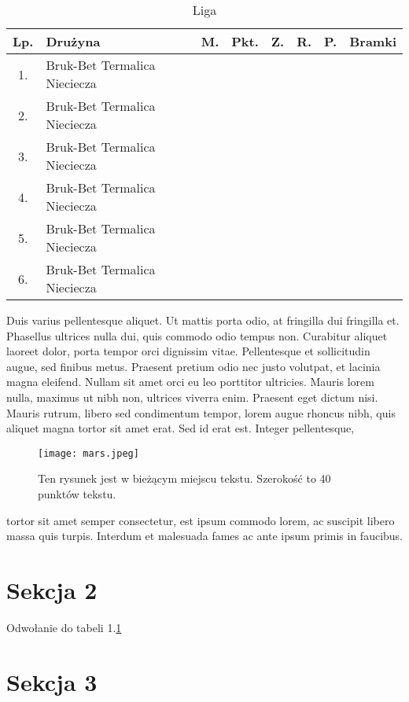 \documentclass[11pt,a4paper]{article}  %
\begin{document}
\begin{table}[h]
\centering
\label{tab:tabela}

\begin{tabular}{|c|l|c|c|c|c|c|c|}
\hline
Lp. & Drużyna & M. & Pkt. & Z. & R. & P. & Bramki \\ \hline
1.  & Bruk-Bet Termalica Nieciecza        &    &      &    &    &    &        \\ \hline
2.  & Bruk-Bet Termalica Nieciecza        &    &      &    &    &    &        \\ \hline
3.  & Bruk-Bet Termalica Nieciecza       &    &      &    &    &    &        \\ \hline
4.  & Bruk-Bet Termalica Nieciecza        &    &      &    &    &    &        \\ \hline
5.  & Bruk-Bet Termalica Nieciecza        &    &      &    &    &    &        \\ \hline
6.  & Bruk-Bet Termalica Nieciecza       &    &      &    &    &    &        \\ \hline

\end{tabular}
\caption{Liga}
\end{table}

Duis varius pellentesque aliquet. Ut mattis porta odio, at fringilla dui fringilla et. Phasellus ultrices nulla dui, quis commodo odio tempus non. Curabitur aliquet laoreet dolor, porta tempor orci dignissim vitae. Pellentesque et sollicitudin augue, sed finibus metus. Praesent pretium odio nec justo volutpat, et lacinia magna eleifend. Nullam sit amet orci eu leo porttitor ultricies. Mauris lorem nulla, maximus ut nibh non, ultrices viverra enim. Praesent eget dictum nisi. Mauris rutrum, libero sed condimentum tempor, lorem augue rhoncus nibh, quis aliquet magna tortor sit amet erat. Sed id erat est. Integer pellentesque,
\begin{figure}[ht]
\centering
        \texttt{[image: mars.jpeg]}
        \caption{ Ten rysunek jest w bieżącym miejscu tekstu. Szerokość to 40 punktów tekstu.}
\end{figure}
tortor sit amet semper consectetur, est ipsum commodo lorem, ac suscipit libero massa quis turpis. Interdum et malesuada fames ac ante ipsum primis in faucibus.
\section{Sekcja 2}
Odwołanie do tabeli 1.\ref{tab:tabela}
\section{Sekcja 3}
\end{document}

